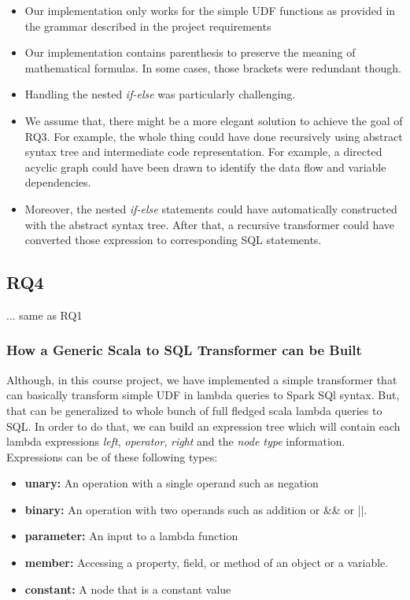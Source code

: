 \documentclass[sigplan]{acmart}\settopmatter{printfolios=true,printccs=false,printacmref=false}
\begin{document}
\begin{itemize}
    \item Our implementation only works for the simple UDF functions as provided in the grammar described in the project requirements
    \item Our implementation contains parenthesis to preserve the meaning of mathematical formulas. In some cases, those brackets were redundant though.
    \item Handling the nested \textit{if-else} was particularly challenging. 
    \item We assume that, there might be a more elegant solution to achieve the goal of RQ3. For example, the whole thing could have done recursively using abstract syntax tree and intermediate code representation. For example, a directed acyclic graph could have been drawn to identify the data flow and variable dependencies. 
    \item Moreover, the nested \textit{if-else} statements could have automatically constructed with the abstract syntax tree. After that, a recursive transformer could have converted those expression to corresponding SQL statements. 
\end{itemize}

\subsection{RQ4}
... same as RQ1

\subsubsection{How a Generic Scala to SQL Transformer can be Built}
Although, in this course project, we have implemented a simple transformer that can basically transform simple UDF in lambda queries to Spark SQl syntax. But, that can be generalized to whole bunch of full fledged scala lambda queries to SQL. In order to do that, we can build an expression tree which will contain each lambda expressions \textit{left}, \textit{operator}, \textit{right} and the \textit{node type} information. Expressions can be of these following types: 
\begin{itemize}
    \item \textbf{unary:} An operation with a single operand such as negation
    \item \textbf{binary: }An operation with two operands such as addition or \&\& or ||.
    \item \textbf{parameter: }An input to a lambda function
    \item \textbf{member: }Accessing a property, field, or method of an object or a variable. 
    \item \textbf{constant: }A node that is a constant value
\end{itemize}
\end{document}
